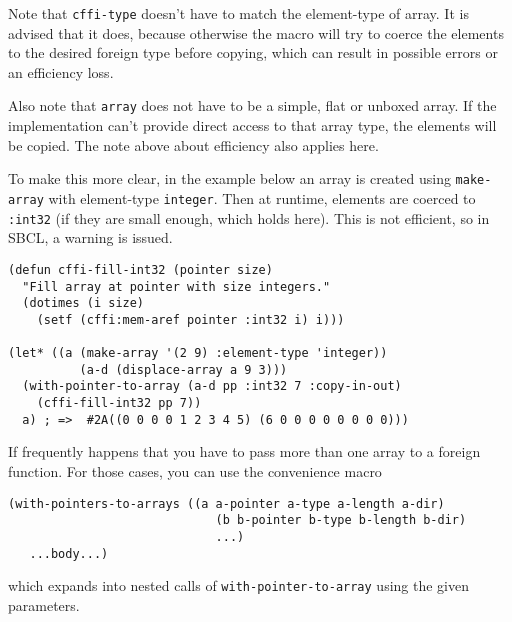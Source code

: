 \documentclass[12pt,a4paper,dvipdfm]{article}
\begin{document}
Note that \lstinline!cffi-type! doesn't have to match the element-type
of array.  It is advised that it does, because otherwise the macro
will try to coerce the elements to the desired foreign type before
copying, which can result in possible errors or an efficiency loss.

Also note that \lstinline!array! does not have to be a simple, flat or
unboxed array.  If the implementation can't provide direct access to
that array type, the elements will be copied.  The note above about
efficiency also applies here.

To make this more clear, in the example below an array is created
using \lstinline!make-array! with element-type \lstinline!integer!.
Then at runtime, elements are coerced to \lstinline!:int32! (if they
are small enough, which holds here).  This is not efficient, so in
SBCL, a warning is issued.

\begin{lstlisting}
(defun cffi-fill-int32 (pointer size)
  "Fill array at pointer with size integers."
  (dotimes (i size)
    (setf (cffi:mem-aref pointer :int32 i) i)))

(let* ((a (make-array '(2 9) :element-type 'integer))
	      (a-d (displace-array a 9 3)))
  (with-pointer-to-array (a-d pp :int32 7 :copy-in-out)
    (cffi-fill-int32 pp 7))
  a) ; =>  #2A((0 0 0 0 1 2 3 4 5) (6 0 0 0 0 0 0 0 0)))
\end{lstlisting}

If frequently happens that you have to pass more than one array to a
foreign function.  For those cases, you can use the convenience macro

\begin{lstlisting}
(with-pointers-to-arrays ((a a-pointer a-type a-length a-dir)
                             (b b-pointer b-type b-length b-dir)
                             ...)
   ...body...)
\end{lstlisting}
which expands into nested calls of \lstinline!with-pointer-to-array!
using the given parameters.
\end{document}
